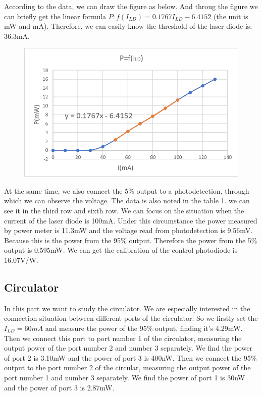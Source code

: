 \documentclass{article}
\begin{document}
	According to the data, we can draw the figure as below. And throug the figure we can briefly get the linear formula $P:f(I_{LD}) = 0.1767I_{LD} - 6.4152$ (the unit is mW and mA). Therefore, we can easily know the threshold of the laser diode is: 36.3mA. 
		
	\begin{figure}[H]
		\centering
		\includegraphics[width=0.7\linewidth]{figrue2}
		\caption{}
		\label{fig:figrue2}
	\end{figure}

	At the same time, we also connect the 5\% output to a photodetection, through which we can observe the voltage. The data is also noted in the table 1. we can see it in the third row and sixth row. We can focus on the situation when the current of the laser diode is 100mA. Under this circumstance the power measured by power meter is 11.3mW and the voltage read from photodetection is 9.56mV. Because this is the power from the 95\% output. Therefore the power from the 5\% output is 0.595mW. We can get the calibration of the control photodiode is 16.07V/W.
	
	\subsection{Circulator}
	In this part we want to study the circulator. We are especially interested in the connection situation between different ports of the circulator. So we firstly set the $I_{LD} = 60mA$ and measure the power of the 95\% output, finding it's 4.29mW. Then we connect this port to port number 1 of the circulator, measuring the output power of the port number 2 and number 3 separately. We find the power of port 2 is 3.10mW and the power of port 3 is 400nW. Then we connect the 95\% output to the port number 2 of the circular, measuring the output power of the port number 1 and number 3 separately. We find the power of port 1 is 30nW and the power of port 3 is 2.87mW.
	
\end{document}
